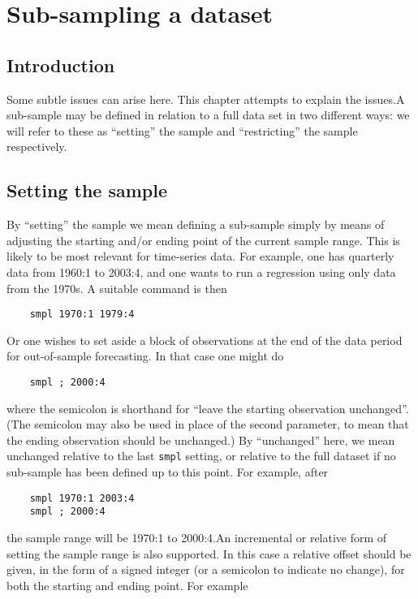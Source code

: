 \chapter{Sub-sampling a dataset}
\label{sampling}

\section{Introduction}
\label{sample-intro}

Some subtle issues can arise here.  This chapter attempts to explain
the issues.A sub-sample may be defined in relation to a full data set
in two different ways: we will refer to these as ``setting'' the
sample and ``restricting'' the sample respectively.

\section{Setting the sample}
\label{sample-set}

By ``setting'' the sample we mean defining a sub-sample simply by
means of adjusting the starting and/or ending point of the current
sample range.  This is likely to be most relevant for time-series
data.  For example, one has quarterly data from 1960:1 to 2003:4, and
one wants to run a regression using only data from the 1970s.  A
suitable command is then

      
\begin{verbatim}
	smpl 1970:1 1979:4
\end{verbatim}
Or one wishes to set aside a block of observations at the end of the
data period for out-of-sample forecasting.  In that case one might do

      
\begin{verbatim}
	smpl ; 2000:4
\end{verbatim}
where the semicolon is shorthand for ``leave the starting observation
unchanged''.  (The semicolon may also be used in place of the second
parameter, to mean that the ending observation should be unchanged.)
By ``unchanged'' here, we mean unchanged relative to the last
\verb+smpl+ setting, or relative to the full dataset if no sub-sample
has been defined up to this point. For example, after

      
\begin{verbatim}
	smpl 1970:1 2003:4
	smpl ; 2000:4
\end{verbatim}
the sample range will be 1970:1 to 2000:4.An incremental or relative
form of setting the sample range is also supported.  In this case a
relative offset should be given, in the form of a signed integer (or a
semicolon to indicate no change), for both the starting and ending
point. For example

